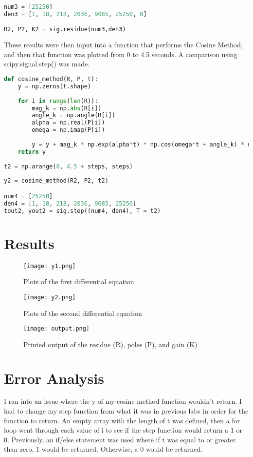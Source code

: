 \documentclass[12pt]{report}
\begin{document}
\begin{lstlisting}[language=Python, caption=sig.residue() of the second differential equation]
num3 = [25250]
den3 = [1, 18, 218, 2036, 9085, 25250, 0]

R2, P2, K2 = sig.residue(num3,den3)
\end{lstlisting}

These results were then input into a function that performs the Cosine Method, and then that function was plotted from 0 to 4.5 seconds. A comparison using scipy.signal.step() was made.

\begin{lstlisting}[language=Python, caption=Cosine Method]
def cosine_method(R, P, t):
    y = np.zeros(t.shape)
    
    for i in range(len(R)):
        mag_k = np.abs(R[i])
        angle_k = np.angle(R[i])
        alpha = np.real(P[i])
        omega = np.imag(P[i])
        
        y = y + mag_k * np.exp(alpha*t) * np.cos(omega*t + angle_k) * u(t)
    return y
    
t2 = np.arange(0, 4.5 + steps, steps)
    
y2 = cosine_method(R2, P2, t2)

num4 = [25250]
den4 = [1, 18, 218, 2036, 9085, 25250]
tout2, yout2 = sig.step((num4, den4), T = t2)
\end{lstlisting}

\section{Results}

\begin{figure}[htp]
    \centering
    \texttt{[image: y1.png]}
    \caption{Plots of the first differential equation}
\end{figure}

\begin{figure}[htp]
    \centering
    \texttt{[image: y2.png]}
    \caption{Plots of the second differential equation}
\end{figure}

\begin{figure}[htp]
    \centering
    \texttt{[image: output.png]}
    \caption{Printed output of the residue (R), poles (P), and gain (K)}
\end{figure}

\pagebreak
\section{Error Analysis}
I ran into an issue where the y of my cosine method function wouldn't return. I had to change my step function from what it was in previous labs in order for the function to return. An empty array with the length of t was defined, then a for loop went through each value of i to see if the step function would return a 1 or 0. Previously, an if/else statement was used where if t was equal to or greater than zero, 1 would be returned. Otherwise, a 0 would be returned.
\end{document}
